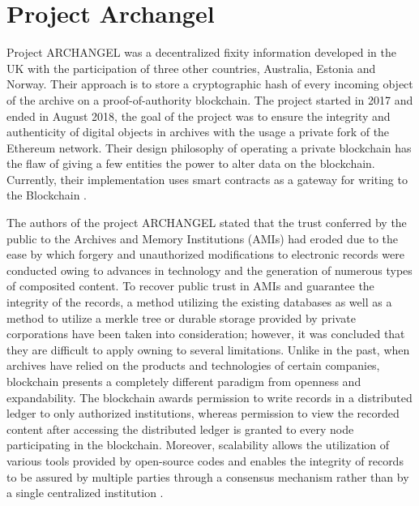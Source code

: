 \section{Project Archangel}
Project ARCHANGEL was a decentralized fixity information developed in the UK with the participation of three other countries, Australia, Estonia and Norway. Their approach is to store a cryptographic hash of every incoming object of the archive on a proof-of-authority blockchain. The project started in 2017 and ended in August 2018, the goal of the project was to ensure the integrity and authenticity of digital objects in archives with the usage a private fork of the Ethereum network. Their design philosophy of operating a private blockchain has the flaw of giving a few entities the power to alter data on the blockchain. Currently, their implementation uses smart contracts as a gateway for writing to the Blockchain \cite[4]{collomosse2018archangel}.

The authors of the project ARCHANGEL stated that the trust conferred by the public to the Archives and Memory Institutions (AMIs) had eroded due to the ease by which forgery and unauthorized modifications to electronic records were conducted owing to advances in technology and the generation of numerous types of composited content. To recover public trust in AMIs and guarantee the integrity of the records, a method utilizing the existing databases as well as a method to utilize a merkle tree or  durable storage provided by private corporations have been taken into consideration; however, it was concluded that they are difficult to apply owning to several limitations. Unlike in the past, when archives have relied on the products and technologies of certain companies, blockchain presents a completely different paradigm from openness and expandability. The blockchain awards permission to write records in a distributed ledger to only authorized institutions, whereas permission to view the recorded content after accessing the distributed ledger is granted to every node participating in the blockchain. Moreover, scalability allows the utilization of various tools provided by open-source codes and enables the integrity of records to be assured by multiple parties through a consensus mechanism rather than by a single centralized institution \cite[4]{wang2021research}.

